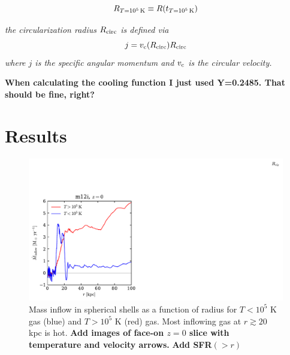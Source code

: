 \documentclass[fleqn,usenatbib]{mnras}
\newcommand{\Rcool}{R_{T=10^5\,{\rm K}}}
\newcommand{\Rcirc}{R_{\rm circ}} %
\begin{document}
\begin{equation}
    \Rcool \equiv R(t_{T=10^5\,{\rm K}})
\end{equation}


\textit{the circularization radius $\Rcirc$ is defined via}
\begin{equation}
    j = v_{\rm c}(\Rcirc)\Rcirc
\end{equation}
\textit{where $j$ is the specific angular momentum and $v_{\rm c}$ is the circular velocity.}

\textbf{When calculating the cooling function I just used Y=0.2485. That should be fine, right?}

\section{Results}

\begin{figure}
    \centering
    \includegraphics{Mdot_m12i.pdf}
    \caption{
    Mass inflow in spherical shells as a function of radius for $T < 10^5$ K gas (blue) and $T>10^5$ K (red) gas.
    Most inflowing gas at $r\gtrsim 20 $ kpc is hot.
    \textbf{Add images of face-on $z=0$ slice with temperature and velocity arrows.}
    \textbf{Add SFR$(>r)$}
    }
    \label{f:Mdot}
\end{figure}
\end{document}
